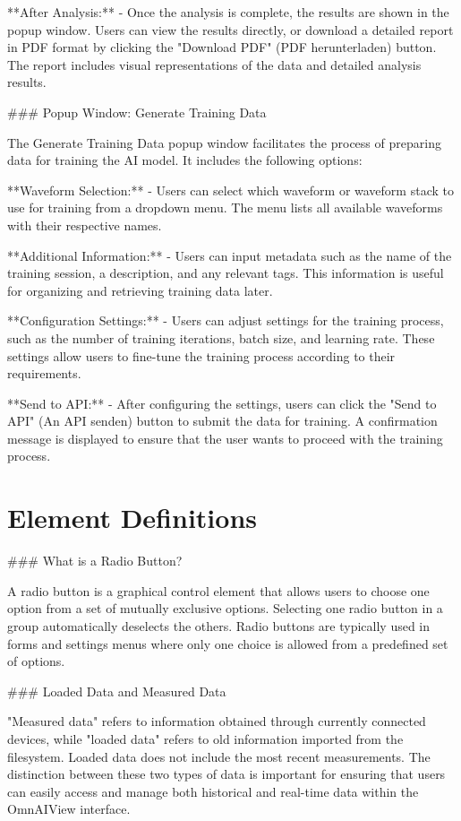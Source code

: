 \documentclass[]{scrreprt}
\begin{document}
**After Analysis:**
- Once the analysis is complete, the results are shown in the popup window. Users can view the results directly, or download a detailed report in PDF format by clicking the "Download PDF" (PDF herunterladen) button. The report includes visual representations of the data and detailed analysis results.

### Popup Window: Generate Training Data \label{cap:PopupWindow_generate_training_data}

The Generate Training Data popup window facilitates the process of preparing data for training the AI model. It includes the following options:

**Waveform Selection:**
- Users can select which waveform or waveform stack to use for training from a dropdown menu. The menu lists all available waveforms with their respective names.

**Additional Information:**
- Users can input metadata such as the name of the training session, a description, and any relevant tags. This information is useful for organizing and retrieving training data later.

**Configuration Settings:**
- Users can adjust settings for the training process, such as the number of training iterations, batch size, and learning rate. These settings allow users to fine-tune the training process according to their requirements.

**Send to API:**
- After configuring the settings, users can click the "Send to API" (An API senden) button to submit the data for training. A confirmation message is displayed to ensure that the user wants to proceed with the training process.

\section{Element Definitions}

### What is a Radio Button? \label{cap:RadioButton}

A radio button is a graphical control element that allows users to choose one option from a set of mutually exclusive options. Selecting one radio button in a group automatically deselects the others. Radio buttons are typically used in forms and settings menus where only one choice is allowed from a predefined set of options.

### Loaded Data and Measured Data \label{cap:loadedData}

"Measured data" refers to information obtained through currently connected devices, while "loaded data" refers to old information imported from the filesystem. Loaded data does not include the most recent measurements. The distinction between these two types of data is important for ensuring that users can easily access and manage both historical and real-time data within the OmnAIView interface.
\end{document}
